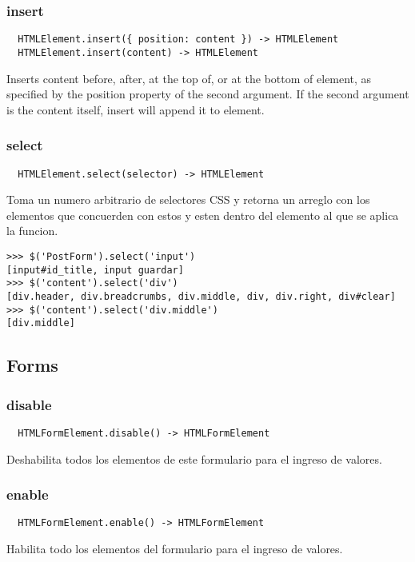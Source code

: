 \subsubsection*{insert}
\begin{verbatim}
  HTMLElement.insert({ position: content }) -> HTMLElement
  HTMLElement.insert(content) -> HTMLElement
\end{verbatim}
Inserts content before, after, at the top of, or at the bottom of element, as
specified by the position property of the second argument. If the second
argument is the content itself, insert will append it to element.

\subsubsection*{select}
\begin{verbatim}
  HTMLElement.select(selector) -> HTMLElement
\end{verbatim}
Toma un numero arbitrario de selectores CSS y retorna un arreglo con los
elementos que concuerden con estos y esten dentro del elemento al que se aplica
la funcion.

\begin{lstlisting}[style=consola]
>>> $('PostForm').select('input')
[input#id_title, input guardar]
>>> $('content').select('div')
[div.header, div.breadcrumbs, div.middle, div, div.right, div#clear]
>>> $('content').select('div.middle')
[div.middle]
\end{lstlisting}

\subsection{Forms}
\subsubsection*{disable}
\begin{verbatim}
  HTMLFormElement.disable() -> HTMLFormElement
\end{verbatim}
Deshabilita todos los elementos de este formulario para el ingreso de valores.

\subsubsection*{enable}
\begin{verbatim}
  HTMLFormElement.enable() -> HTMLFormElement
\end{verbatim}
Habilita todo los elementos del formulario para el ingreso de valores.

